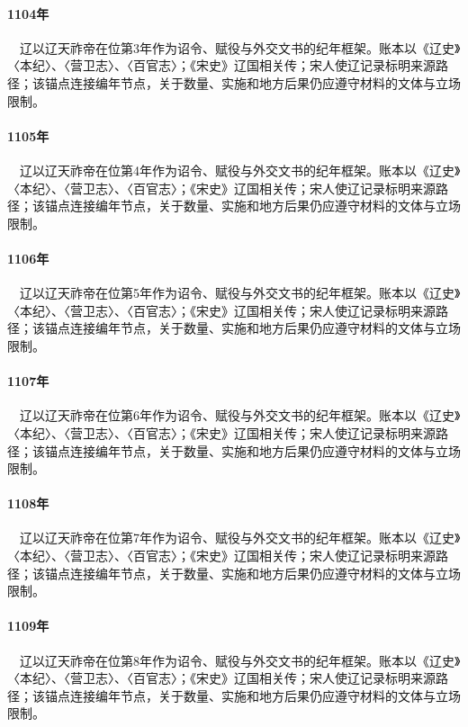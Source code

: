 \paragraph{1104年}　辽以辽天祚帝在位第3年作为诏令、赋役与外交文书的纪年框架。账本以《辽史》〈本纪〉、〈营卫志〉、〈百官志〉；《宋史》辽国相关传；宋人使辽记录标明来源路径；该锚点连接编年节点，关于数量、实施和地方后果仍应遵守材料的文体与立场限制。

\paragraph{1105年}　辽以辽天祚帝在位第4年作为诏令、赋役与外交文书的纪年框架。账本以《辽史》〈本纪〉、〈营卫志〉、〈百官志〉；《宋史》辽国相关传；宋人使辽记录标明来源路径；该锚点连接编年节点，关于数量、实施和地方后果仍应遵守材料的文体与立场限制。

\paragraph{1106年}　辽以辽天祚帝在位第5年作为诏令、赋役与外交文书的纪年框架。账本以《辽史》〈本纪〉、〈营卫志〉、〈百官志〉；《宋史》辽国相关传；宋人使辽记录标明来源路径；该锚点连接编年节点，关于数量、实施和地方后果仍应遵守材料的文体与立场限制。

\paragraph{1107年}　辽以辽天祚帝在位第6年作为诏令、赋役与外交文书的纪年框架。账本以《辽史》〈本纪〉、〈营卫志〉、〈百官志〉；《宋史》辽国相关传；宋人使辽记录标明来源路径；该锚点连接编年节点，关于数量、实施和地方后果仍应遵守材料的文体与立场限制。

\paragraph{1108年}　辽以辽天祚帝在位第7年作为诏令、赋役与外交文书的纪年框架。账本以《辽史》〈本纪〉、〈营卫志〉、〈百官志〉；《宋史》辽国相关传；宋人使辽记录标明来源路径；该锚点连接编年节点，关于数量、实施和地方后果仍应遵守材料的文体与立场限制。

\paragraph{1109年}　辽以辽天祚帝在位第8年作为诏令、赋役与外交文书的纪年框架。账本以《辽史》〈本纪〉、〈营卫志〉、〈百官志〉；《宋史》辽国相关传；宋人使辽记录标明来源路径；该锚点连接编年节点，关于数量、实施和地方后果仍应遵守材料的文体与立场限制。

